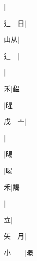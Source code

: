 \begin{multicols}{2}
{{\cjk{}{\cnsym{}　}{\cnsym{}　}{\cnsym{}　}}|{}\par
{\cjk{}辶{\cnsym{}　}日}|{}\par
{\cjk{}{\cnsym{}　}山从}|{}\par
{辶{\cnsym{}　}}|{}\par
{\cjk{}{\cnsym{}　}{\cnsym{}　}{\cnsym{}　}}|{}\par
{\cjk{}{\cnsym{}　}{\cnsym{}　}禾}|{\cjk{}馧}\par
{\cjk{}{\cnsym{}　}{\cnsym{}　}{\cnsym{}　}}|{\cjk{}暒}\par
{\cjk{}戊{\cnsym{}　}亠}|{}\par
{}|{}\par
{\cjk{}{\cnsym{}　}{\cnsym{}　}{\cnsym{}　}}|{\cjk{}晹}\par
{\cjk{}{\cnsym{}　}{\cnsym{}　}{\cnsym{}　}}|{\cjk{}暍}\par
{\cjk{}{\cnsym{}　}{\cnsym{}　}禾}|{\cjk{}馤}\par
{\cjk{}{\cnsym{}　}{\cnsym{}　}{\cnsym{}　}}|{}\par
{\cjk{}{\cnsym{}　}{\cnsym{}　}立}|{}\par
{\cjk{}矢{\cnsym{}　}月}|{}\par
{\cjk{}小{\cnsym{}　}{\cnsym{}　}}|{\cjk{}暻}\par
}
\end{multicols}
